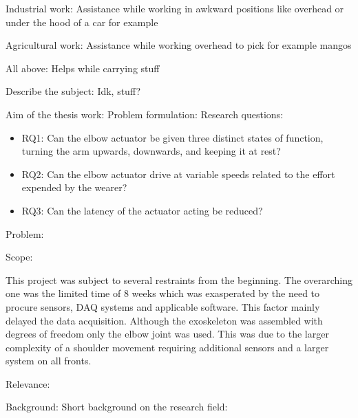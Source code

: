             Industrial work:
                Assistance while working in awkward positions like overhead or under the hood of a car for example

            Agricultural work:
                Assistance while working overhead to pick for example mangos
            
            All above:
                Helps while carrying stuff

    Describe the subject: %
        Idk, stuff?

    Aim of the thesis work: %
        Problem formulation: %
            Research questions:
            \begin{itemize}
                 
                \item RQ1: Can the elbow actuator be given three distinct states of function, turning the arm upwards, downwards, and keeping it at rest?

                \item RQ2: Can the elbow actuator drive at variable speeds related to the effort expended by the wearer?

                \item RQ3: Can the latency of the actuator acting be reduced?

            \end{itemize}

            Problem:
                

            Scope:

            This project was subject to several restraints from the beginning. The overarching one was the limited time of 8 weeks which was
            exasperated by the need to procure sensors, DAQ systems and applicable software. This factor mainly delayed the data acquisition. 
            Although the exoskeleton was assembled with degrees of freedom only the elbow joint was used. This was due to the larger complexity 
            of a shoulder movement requiring additional sensors and a larger system on all fronts.
            
            Relevance: %


Background: 
    Short background on the research field:

